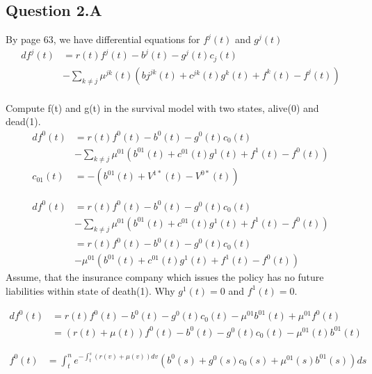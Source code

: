 \documentclass[10pt]{article}
\begin{document}
\subsection{Question 2.A}
By page 63, we have differential equations for $f^j(t)$ and $g^j(t)$
\begin{equation}
\begin{split}
df^j(t) & = r(t)f^j(t) - b^j(t) - g^j(t)c_j(t) 
\\ & - \sum_{k\neq j} \mu^{jk}(t) (bj^{jk}(t) + c^{jk}(t)g^k(t) + f^k(t) - f^j(t)) \\
\end{split}
\end{equation}

Compute f(t) and g(t) in the survival model with two states, alive(0) and dead(1).
\begin{equation}
\begin{split}
df^0(t) & = r(t)f^0(t) - b^0(t) - g^0(t)c_0(t) 
\\ & - \sum_{k\neq j} \mu^{01}(b^{01}(t) + c^{01}(t)g^1(t) + f^1(t) - f^0(t))
\\ c_{01}(t) & = -(b^{01}(t) + V^{1*}(t) - V^{0*}(t))
\end{split}
\end{equation}

\begin{equation}
\begin{split}
df^0(t) & = r(t)f^0(t) - b^0(t) - g^0(t)c_0(t) 
\\ & - \sum_{k\neq j} \mu^{01}(b^{01}(t) + c^{01}(t)g^1(t) + f^1(t) - f^0(t))
\\ & = r(t)f^0(t) - b^0(t) - g^0(t)c_0(t) 
\\ & - \mu^{01}(b^{01}(t) + c^{01}(t)g^1(t) + f^1(t) - f^0(t))
\end{split}
\end{equation}
Assume, that the insurance company which issues the policy has no future liabilities within state of death(1). Why $g^1(t) = 0$ and $f^1(t) = 0$. 

\begin{equation}
\begin{split}
df^0(t) & = r(t)f^0(t) - b^0(t) - g^0(t)c_0(t) - \mu^{01}b^{01}(t) + \mu^{01}f^0(t)
\\ & = (r(t) + \mu(t))f^0(t) - b^0(t) - g^0(t)c_0(t) - \mu^{01}(t)b^{01}(t)
\end{split}
\end{equation}

\begin{equation}
\begin{split}
f^0(t) & = \int_t^n e^{-\int_t^s(r(v)+\mu(v))dv} (b^0(s) + g^0(s)c_0(s) + \mu^{01}(s)b^{01}(s))ds
\end{split}
\end{equation}
\end{document}
